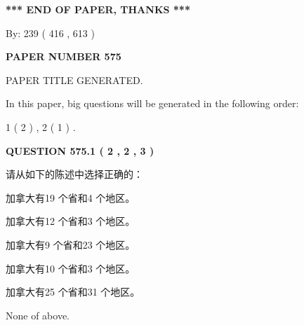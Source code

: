 \documentclass{ctexart}
\begin{document}
   
   
   
\vspace{1.0in} 
{\textbf{\large{ *** END OF PAPER, THANKS *** }}} 
   
   
\hspace{1.0in} By: 
 239 ( 416 ,  613 )
   
   
   
   
\newpage 
\setcounter{page}{ 
   575001 } 
   
   
   
   
 {\textbf{ \Large{ PAPER NUMBER  575  }}}
   
   
\vspace{0.2in}
   
   
   
   
   
   
   
   
 \vspace{0.2in}
 
 
 
 
   
   
 PAPER TITLE GENERATED.
   
   
   
\vspace{0.2in}
   
In this paper, big questions will be generated in the following order: 
   
   
   1 ( 2 )
 ,
   2 ( 1 )
 .
  
\vspace{0.2in}
  
{\textbf{\Large{QUESTION
575.1 
 ( 2 , 2 , 3 )
}}}
  
  
请从如下的陈述中选择正确的：
 
 
加拿大有19 个省和4 个地区。
 
 
加拿大有12 个省和3 个地区。
 
 
加拿大有9 个省和23 个地区。
 
 
加拿大有10 个省和3 个地区。
 
 
加拿大有25 个省和31 个地区。
 
 
 None of above.
 
 
\noindent{}
 
\end{document}
